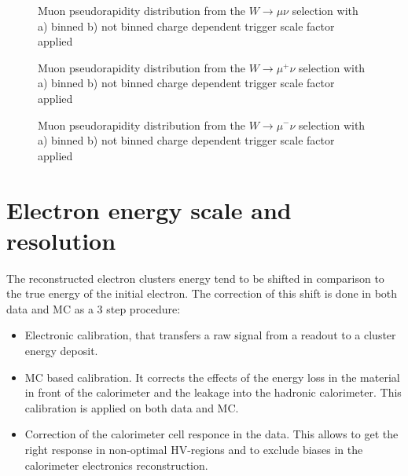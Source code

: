 \begin{figure}[!tbp]
\endminipage\hfill
{}
\endminipage\hfill
\caption{Muon pseudorapidity distribution from the $W\to \mu \nu$ selection with a) binned  b) not binned charge dependent trigger scale factor applied}
\label{fig:SFBined1}
\end{figure}

\begin{figure}[!tbp]
\endminipage\hfill
{}
\endminipage\hfill
\caption{Muon pseudorapidity distribution from the $W\to \mu^+ \nu$ selection with a) binned  b) not binned charge dependent trigger scale factor applied}
\label{fig:SFBined2}
\end{figure}

\begin{figure}[!tbp]
\endminipage\hfill
{}
\endminipage\hfill
\caption{Muon pseudorapidity distribution from the $W\to \mu^- \nu$ selection with a) binned  b) not binned charge dependent trigger scale factor applied}
\label{fig:SFBined3}
\end{figure}

\section{Electron energy scale and resolution}\label{sec:elecScale}
The reconstructed electron clusters energy tend to be shifted in comparison to the true energy of the initial electron. The correction of this shift is done in both data and MC as a 3 step procedure:
\begin{itemize}
\item Electronic calibration, that transfers a raw signal from a readout to a cluster energy deposit.
\item MC based calibration. It corrects the effects of the energy loss in the material in front of the calorimeter and the leakage into the hadronic calorimeter. This calibration is applied on both data and MC.
\item Correction of the calorimeter cell responce in the data. This allows to get the right response in non-optimal HV-regions and to exclude biases in the calorimeter electronics reconstruction.
\end{itemize}

